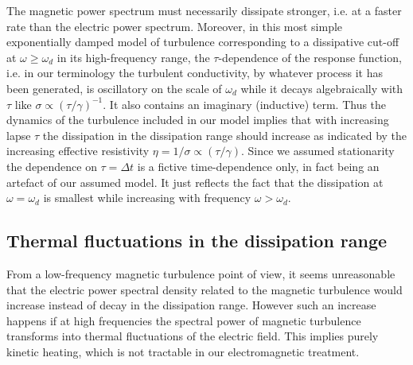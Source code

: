 \documentclass[ ]{copernicus2}
\begin{document}
{{{The magnetic power spectrum must necessarily dissipate stronger, i.e. at a faster rate than the electric power spectrum. Moreover, in this most simple exponentially damped model of turbulence corresponding to a dissipative cut-off at $\omega\geq\omega_d$ in its high-frequency range, the $\tau$-dependence of the response function, i.e. in our terminology the turbulent conductivity, by whatever process it has been generated, is oscillatory on the scale of $\omega_d$ while it decays algebraically with $\tau$ like $\sigma\propto (\tau/\gamma)^{-1}$. It also contains an imaginary (inductive) term. Thus the dynamics of the turbulence included in our model implies that with increasing lapse $\tau$ the dissipation in the dissipation range should increase as indicated by the increasing effective resistivity $\eta=1/\sigma\propto(\tau/\gamma) $. Since we assumed stationarity the dependence on $\tau=\Delta t$ is a fictive time-dependence only, in fact being an artefact of our assumed model. It just reflects the fact that the dissipation at $\omega=\omega_d$ is smallest while increasing with frequency $\omega>\omega_d$.  

\subsection{Thermal fluctuations in the dissipation range}
From a low-frequency magnetic turbulence point of view, it seems unreasonable that the electric power spectral density related to the magnetic turbulence would increase instead of decay in the dissipation range. However such an increase happens if at high frequencies the spectral power of magnetic turbulence transforms into thermal fluctuations of the electric field. This implies purely kinetic heating, {which is not tractable in our electromagnetic treatment.}

}}}
\end{document}
